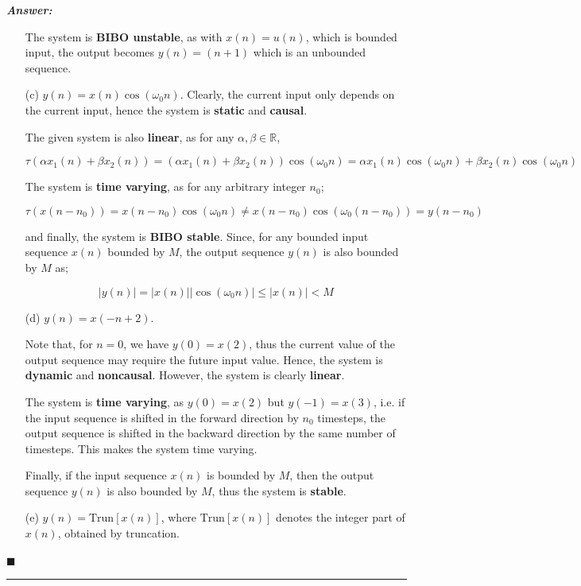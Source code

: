 \documentclass[12pt]{article}
\theoremstyle{definition}
\newenvironment{answer}{
    \textbf{\textit{Answer:}} \qquad
}{\hfill $\blacksquare$ \\ \begin{center}
    \rule{0.6\linewidth}{0.5px}    
\end{center}
}
\newcommand{\R}{\mathbb{R}}
\begin{document}
\begin{answer}
\begin{enumerate}
        The system is \textbf{BIBO unstable}, as with $x(n) = u(n)$, which is bounded input, the output becomes $y(n) = (n+1)$ which is an unbounded sequence.

        \item[(c)] $y(n) = x(n) \cos(\omega_0 n)$. Clearly, the current input only depends on the current input, hence the system is \textbf{static} and \textbf{causal}. 
        
        The given system is also \textbf{linear}, as for any $\alpha, \beta \in \R$,

        $$
        \tau(\alpha x_1(n) + \beta x_2(n)) = (\alpha x_1(n) + \beta x_2(n)) \cos(\omega_0 n) = \alpha x_1(n)\cos(\omega_0 n) + \beta x_2(n) \cos(\omega_0 n)
        $$

        The system is \textbf{time varying}, as for any arbitrary integer $n_0$;

        $$
        \tau(x(n - n_0)) = x(n - n_0)\cos(\omega_0 n) \neq x(n - n_0)\cos(\omega_0 (n - n_0)) = y(n-n_0)
        $$

        and finally, the system is \textbf{BIBO stable}. Since, for any bounded input sequence $x(n)$ bounded by $M$, the output sequence $y(n)$ is also bounded by $M$ as;

        $$
        \vert y(n) \vert = \vert x(n) \vert \vert \cos(\omega_0 n) \vert \leq \vert x(n) \vert < M
        $$

        \item[(d)] $y(n) = x(-n+2)$.
        
        Note that, for $n = 0$, we have $y(0) = x(2)$, thus the current value of the output sequence may require the future input value. Hence, the system is \textbf{dynamic} and \textbf{noncausal}. However, the system is clearly \textbf{linear}.

        The system is \textbf{time varying}, as $y(0) = x(2)$ but $y(-1) = x(3)$, i.e. if the input sequence is shifted in the forward direction by $n_0$ timesteps, the output sequence is shifted in the backward direction by the same number of timesteps. This makes the system time varying.

        Finally, if the input sequence $x(n)$ is bounded by $M$, then the output sequence $y(n)$ is also bounded by $M$, thus the system is \textbf{stable}.
         
        \item[(e)] $y(n) = \text{Trun}[x(n)]$, where $\text{Trun}[x(n)]$ denotes the integer part of $x(n)$, obtained by truncation.
        

\end{enumerate}
\end{answer}
\end{document}
